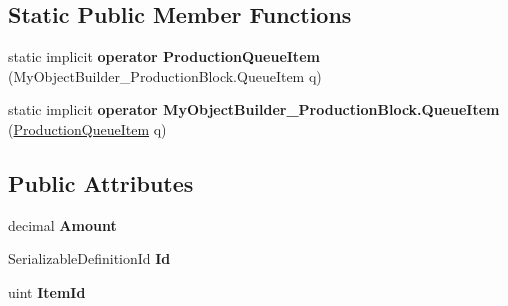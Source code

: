 \subsection*{Static Public Member Functions}
\begin{DoxyCompactItemize}
\item 
\hypertarget{class_s_e_mod_a_p_i_internal_1_1_a_p_i_1_1_entity_1_1_sector_1_1_sector_object_1_1_cube_grid_1_199e35bb6148552a88d941dc080ac8a36_aa372c701a783684d4900f9152c44822a}{}static implicit {\bfseries operator Production\+Queue\+Item} (My\+Object\+Builder\+\_\+\+Production\+Block.\+Queue\+Item q)\label{class_s_e_mod_a_p_i_internal_1_1_a_p_i_1_1_entity_1_1_sector_1_1_sector_object_1_1_cube_grid_1_199e35bb6148552a88d941dc080ac8a36_aa372c701a783684d4900f9152c44822a}

\item 
\hypertarget{class_s_e_mod_a_p_i_internal_1_1_a_p_i_1_1_entity_1_1_sector_1_1_sector_object_1_1_cube_grid_1_199e35bb6148552a88d941dc080ac8a36_a58f4f34be5396dbabb0c19fa9642c638}{}static implicit {\bfseries operator My\+Object\+Builder\+\_\+\+Production\+Block.\+Queue\+Item} (\hyperlink{class_s_e_mod_a_p_i_internal_1_1_a_p_i_1_1_entity_1_1_sector_1_1_sector_object_1_1_cube_grid_1_199e35bb6148552a88d941dc080ac8a36}{Production\+Queue\+Item} q)\label{class_s_e_mod_a_p_i_internal_1_1_a_p_i_1_1_entity_1_1_sector_1_1_sector_object_1_1_cube_grid_1_199e35bb6148552a88d941dc080ac8a36_a58f4f34be5396dbabb0c19fa9642c638}

\end{DoxyCompactItemize}
\subsection*{Public Attributes}
\begin{DoxyCompactItemize}
\item 
\hypertarget{class_s_e_mod_a_p_i_internal_1_1_a_p_i_1_1_entity_1_1_sector_1_1_sector_object_1_1_cube_grid_1_199e35bb6148552a88d941dc080ac8a36_a4cb8badf7c8ff912b9d3b1c45b32ae38}{}decimal {\bfseries Amount}\label{class_s_e_mod_a_p_i_internal_1_1_a_p_i_1_1_entity_1_1_sector_1_1_sector_object_1_1_cube_grid_1_199e35bb6148552a88d941dc080ac8a36_a4cb8badf7c8ff912b9d3b1c45b32ae38}

\item 
\hypertarget{class_s_e_mod_a_p_i_internal_1_1_a_p_i_1_1_entity_1_1_sector_1_1_sector_object_1_1_cube_grid_1_199e35bb6148552a88d941dc080ac8a36_a710bb5dd2f69caa26260b61e1318f4f7}{}Serializable\+Definition\+Id {\bfseries Id}\label{class_s_e_mod_a_p_i_internal_1_1_a_p_i_1_1_entity_1_1_sector_1_1_sector_object_1_1_cube_grid_1_199e35bb6148552a88d941dc080ac8a36_a710bb5dd2f69caa26260b61e1318f4f7}

\item 
\hypertarget{class_s_e_mod_a_p_i_internal_1_1_a_p_i_1_1_entity_1_1_sector_1_1_sector_object_1_1_cube_grid_1_199e35bb6148552a88d941dc080ac8a36_a7babdfee39b1a00a57af8e9c0cf25573}{}uint {\bfseries Item\+Id}\label{class_s_e_mod_a_p_i_internal_1_1_a_p_i_1_1_entity_1_1_sector_1_1_sector_object_1_1_cube_grid_1_199e35bb6148552a88d941dc080ac8a36_a7babdfee39b1a00a57af8e9c0cf25573}

\end{DoxyCompactItemize}


